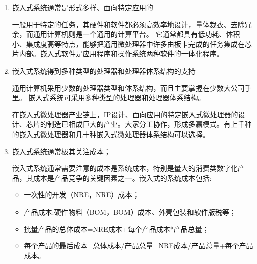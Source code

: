 \begin{enumerate}
\item 嵌{\cf}入式{\cf}系统{\cf}通常{\cf}是形{\cf}式多{\cf}样、{\cf}面向{\cf}特定{\cf}应用{\cf}的

一{\cf}般用{\cf}于特{\cf}定的{\cf}任务{\cf}，其{\cf}硬件{\cf}和软{\cf}件都{\cf}必须{\cf}高效{\cf}率地{\cf}设计{\cf}，量{\cf}体裁{\cf}衣、{\cf}去除{\cf}冗余{\cf}，而{\cf}通用{\cf}计算{\cf}机则{\cf}是一{\cf}个通{\cf}用的{\cf}计算{\cf}平台{\cf}。 {\cf}它通{\cf}常都{\cf}具有{\cf}低功{\cf}耗、{\cf}体积{\cf}小、{\cf}集成{\cf}度高{\cf}等特{\cf}点，{\cf}能够{\cf}把通{\cf}用微{\cf}处理{\cf}器中{\cf}许多{\cf}由板{\cf}卡完{\cf}成的{\cf}任务{\cf}集成{\cf}在芯{\cf}片内{\cf}部。{\cf}嵌入{\cf}式软{\cf}件是{\cf}应用{\cf}程序{\cf}和操{\cf}作系{\cf}统两{\cf}种软{\cf}件的{\cf}一体{\cf}化程序。

\item 嵌{\cf}入式{\cf}系统{\cf}得到{\cf}多种{\cf}类型{\cf}的处{\cf}理器{\cf}和处{\cf}理器{\cf}体系{\cf}结构{\cf}的支持

通{\cf}用计{\cf}算机{\cf}采用{\cf}少数{\cf}的处{\cf}理器{\cf}类型{\cf}和体{\cf}系结{\cf}构，{\cf}而且{\cf}主要{\cf}掌握{\cf}在少{\cf}数大{\cf}公司{\cf}手里{\cf}。 {\cf}嵌入{\cf}式系{\cf}统可{\cf}采用{\cf}多种{\cf}类型{\cf}的处{\cf}理器{\cf}和处{\cf}理器{\cf}体系{\cf}结构。

在{\cf}嵌入{\cf}式微{\cf}处理{\cf}器产{\cf}业链{\cf}上，{\cf}IP{\cf}设计{\cf}、面{\cf}向应{\cf}用的{\cf}特定{\cf}嵌入{\cf}式微{\cf}处理{\cf}器的{\cf}设计{\cf}、芯{\cf}片的{\cf}制造{\cf}已相{\cf}成巨{\cf}大的{\cf}产业{\cf}。大{\cf}家分{\cf}工协{\cf}作，{\cf}形成{\cf}多赢{\cf}模式{\cf}。有{\cf}上千{\cf}种的{\cf}嵌入{\cf}式微{\cf}处理{\cf}器和{\cf}几十{\cf}种嵌{\cf}入式{\cf}微处{\cf}理器{\cf}体系{\cf}结构{\cf}可以{\cf}选择{\cf}。

\item 嵌入{\cf}式系{\cf}统通{\cf}常极{\cf}其关{\cf}注成{\cf}本；

嵌{\cf}入式{\cf}系统{\cf}通常{\cf}需要{\cf}注意{\cf}的成{\cf}本是{\cf}系统{\cf}成本{\cf}，特{\cf}别是{\cf}量大{\cf}的消{\cf}费类{\cf}数字{\cf}化产{\cf}品，{\cf}其成{\cf}本是{\cf}产品{\cf}竞争{\cf}的关{\cf}键因{\cf}素之{\cf}一。{\cf}嵌入{\cf}式的{\cf}系统{\cf}成本{\cf}包括:
\begin{itemize}
\item 一次{\cf}性的{\cf}开发（\acrlong{NRE}，\acrshort{NRE}）成本；
\item 产{\cf}品成{\cf}本:{\cf}硬件{\cf}物料（\acrlong{BOM}，\acrshort{BOM}）成{\cf}本、{\cf}外壳{\cf}包装{\cf}和软{\cf}件版{\cf}税等；
\item 批{\cf}量产{\cf}品的{\cf}总体{\cf}成本{\cf}=N{\cf}RE{\cf}成本{\cf}+每{\cf}个产{\cf}品成{\cf}本*{\cf}产品{\cf}总量{\cf}；
\item 每{\cf}个产{\cf}品的{\cf}最后{\cf}成本{\cf}=总{\cf}体成{\cf}本/{\cf}产品{\cf}总量{\cf}=N{\cf}RE{\cf}成本{\cf}/产{\cf}品总{\cf}量+{\cf}每个{\cf}产品{\cf}成本。
\end{itemize}


\end{enumerate}
